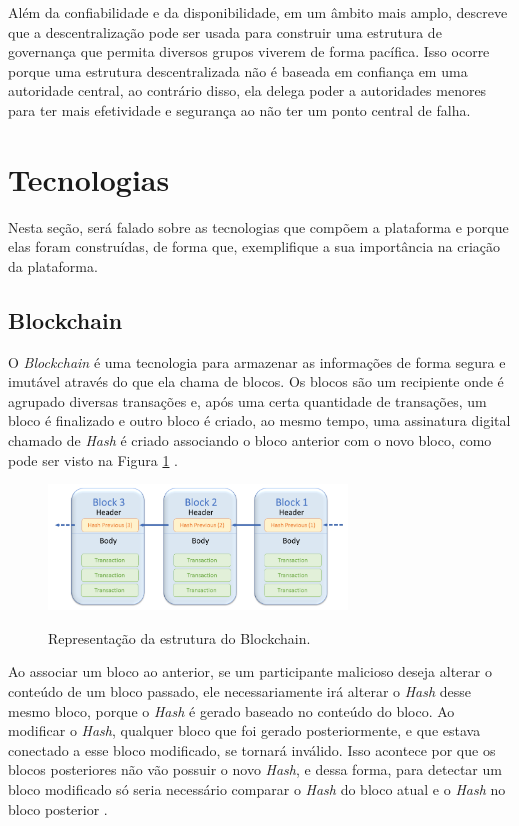 Além da confiabilidade e da disponibilidade, em um âmbito mais amplo, \citeauthor{decentralization} descreve que a descentralização pode ser usada para construir uma estrutura de governança que permita diversos grupos viverem de forma pacífica. Isso ocorre porque uma estrutura descentralizada não é baseada em confiança em uma autoridade central, ao contrário disso, ela delega poder a autoridades menores para ter mais efetividade e segurança ao não ter um ponto central de falha.

\section{Tecnologias}

Nesta seção, será falado sobre as tecnologias que compõem a plataforma e porque elas foram construídas, de forma que, exemplifique a sua importância na criação da plataforma.

\subsection{Blockchain}

O \textit{Blockchain} é uma tecnologia para armazenar as informações de forma segura e imutável através do que ela chama de blocos. Os blocos são um recipiente onde é agrupado diversas transações e, após uma certa quantidade de transações, um bloco é finalizado e outro bloco é criado, ao mesmo tempo, uma assinatura digital chamado de \textit{Hash} é criado associando o bloco anterior com o novo bloco, como pode ser visto na Figura \ref{fig:blockchain_structure} \cite{blockchain}.

\begin{figure}[h!]
  \centering
  \caption{Representação da estrutura do Blockchain.}
  \includegraphics[width=300px]{src/images/representacao_blocos_blockchain.png}
  \label{fig:blockchain_structure}
\end{figure}

Ao associar um bloco ao anterior, se um participante malicioso deseja alterar o conteúdo de um bloco passado, ele necessariamente irá alterar o \textit{Hash} desse mesmo bloco, porque o \textit{Hash} é gerado baseado no conteúdo do bloco. Ao modificar o \textit{Hash}, qualquer bloco que foi gerado posteriormente, e que estava conectado a esse bloco modificado, se tornará inválido. Isso acontece por que os blocos posteriores não vão possuir o novo \textit{Hash}, e dessa forma, para detectar um bloco modificado só seria necessário comparar o \textit{Hash} do bloco atual e o \textit{Hash} no bloco posterior \cite{blockchain_ref_for_block_explanation}. 

